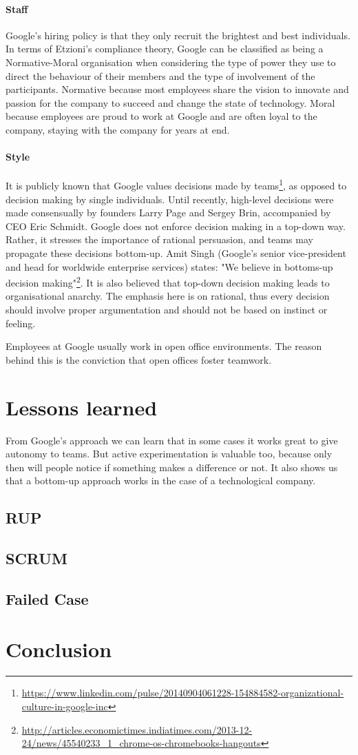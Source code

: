 \paragraph{Staff}
Google's hiring policy is that they only recruit the brightest and best individuals. In terms of Etzioni's compliance theory\citep{lunenburg2013compliance}, Google can be classified as being a Normative-Moral organisation when considering the type of power they use to direct the behaviour of their members and the type of involvement of the participants. Normative because most employees share the vision to innovate and passion for the company to succeed and change the state of technology. Moral because employees are proud to work at Google and are often loyal to the company, staying with the company for years at end.

\paragraph{Style}
It is publicly known that Google values decisions made by teams\footnote{\url{https://www.linkedin.com/pulse/20140904061228-154884582-organizational-culture-in-google-inc}}, as opposed to decision making by single individuals. Until recently, high-level decisions were made consensually by founders Larry Page and Sergey Brin, accompanied by CEO Eric Schmidt. Google does not enforce decision making in a top-down way. Rather, it stresses the importance of rational persuasion, and teams may propagate these decisions bottom-up. Amit Singh (Google's senior vice-president and head for worldwide enterprise services) states: "We believe in bottoms-up decision making"\footnote{\url{http://articles.economictimes.indiatimes.com/2013-12-24/news/45540233_1_chrome-os-chromebooks-hangouts}}. It is also believed that top-down decision making leads to organisational anarchy. The emphasis here is on rational, thus every decision should involve proper argumentation and should not be based on instinct or feeling.

Employees at Google usually work in open office environments. The reason behind this is the conviction that open offices foster teamwork.


\section{Lessons learned}
From Google's approach we can learn that in some cases it works great to give autonomy to teams. But active experimentation is valuable too, because only then will people notice if something makes a difference or not. It also shows us that a bottom-up approach works in the case of a technological company.

\subsection{RUP}

\subsection{SCRUM}

\subsection{Failed Case}

\section{Conclusion}